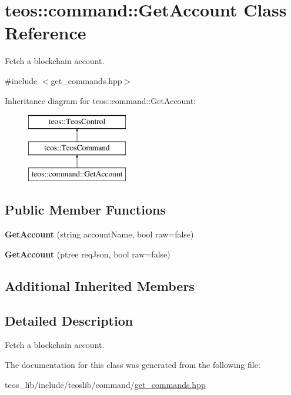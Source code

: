 \hypertarget{classteos_1_1command_1_1_get_account}{}\section{teos\+:\+:command\+:\+:Get\+Account Class Reference}
\label{classteos_1_1command_1_1_get_account}


Fetch a blockchain account.  




{\ttfamily \#include $<$get\+\_\+commands.\+hpp$>$}

Inheritance diagram for teos\+:\+:command\+:\+:Get\+Account\+:\begin{figure}[H]
\begin{center}
\leavevmode
\includegraphics[height=3.000000cm]{classteos_1_1command_1_1_get_account}
\end{center}
\end{figure}
\subsection*{Public Member Functions}
\begin{DoxyCompactItemize}
\item 
\mbox{\label{classteos_1_1command_1_1_get_account_a0e9c495d0f86bda5a8c873a57ce12102}} 
{\bfseries Get\+Account} (string account\+Name, bool raw=false)
\item 
\mbox{\label{classteos_1_1command_1_1_get_account_a57e08f7a17e9d02a886cea53bcce0ce7}} 
{\bfseries Get\+Account} (ptree req\+Json, bool raw=false)
\end{DoxyCompactItemize}
\subsection*{Additional Inherited Members}


\subsection{Detailed Description}
Fetch a blockchain account. 

The documentation for this class was generated from the following file\+:\begin{DoxyCompactItemize}
\item 
teos\+\_\+lib/include/teoslib/command/\mbox{\hyperlink{get__commands_8hpp}{get\+\_\+commands.\+hpp}}\end{DoxyCompactItemize}
